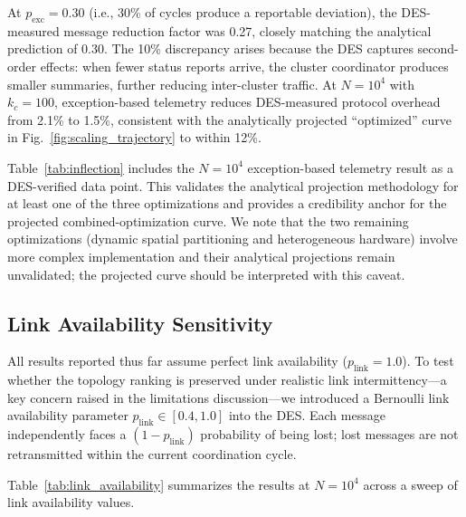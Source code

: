 \documentclass[journal]{IEEEtran}
\begin{document}
At $p_{\text{exc}} = 0.30$ (i.e., 30\% of cycles produce a reportable deviation), the DES-measured message reduction factor was 0.27, closely matching the analytical prediction of 0.30. The 10\% discrepancy arises because the DES captures second-order effects: when fewer status reports arrive, the cluster coordinator produces smaller summaries, further reducing inter-cluster traffic. At $N = 10^4$ with $k_c = 100$, exception-based telemetry reduces DES-measured protocol overhead from 2.1\% to 1.5\%, consistent with the analytically projected ``optimized'' curve in Fig.~\ref{fig:scaling_trajectory} to within 12\%.

Table~\ref{tab:inflection} includes the $N = 10^4$ exception-based telemetry result as a DES-verified data point. This validates the analytical projection methodology for at least one of the three optimizations and provides a credibility anchor for the projected combined-optimization curve. We note that the two remaining optimizations (dynamic spatial partitioning and heterogeneous hardware) involve more complex implementation and their analytical projections remain unvalidated; the projected curve should be interpreted with this caveat.

\subsection{Link Availability Sensitivity}
\label{sec:link_availability}

All results reported thus far assume perfect link availability ($p_{\text{link}} = 1.0$). To test whether the topology ranking is preserved under realistic link intermittency---a key concern raised in the limitations discussion---we introduced a Bernoulli link availability parameter $p_{\text{link}} \in [0.4, 1.0]$ into the DES. Each message independently faces a $(1 - p_{\text{link}})$ probability of being lost; lost messages are not retransmitted within the current coordination cycle.

Table~\ref{tab:link_availability} summarizes the results at $N = 10^4$ across a sweep of link availability values.
\end{document}
